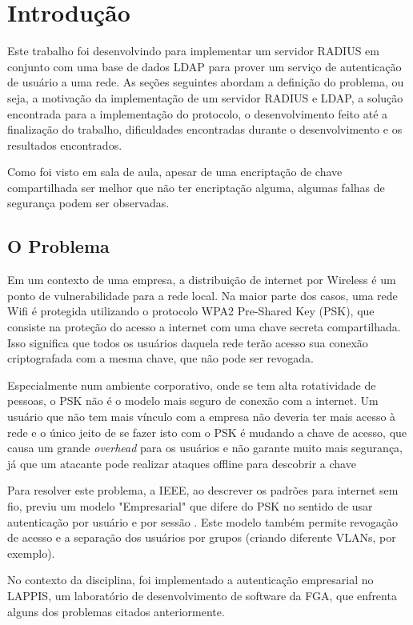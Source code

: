 \section{Introdução}

Este trabalho foi desenvolvindo para implementar um servidor RADIUS em conjunto com uma
base de dados LDAP para prover um serviço de autenticação de usuário a uma rede.
As seções seguintes abordam a definição do problema, ou seja, a motivação da implementação
de um servidor RADIUS e LDAP, a solução encontrada para a implementação do protocolo, o
desenvolvimento feito até a finalização do trabalho, dificuldades encontradas durante o
desenvolvimento e os resultados encontrados.

Como foi visto em sala de aula, apesar de uma encriptação de chave compartilhada
ser melhor que não ter encriptação alguma, algumas falhas de segurança podem ser
observadas.


\subsection{O Problema}

Em um contexto de uma empresa, a distribuição de internet por Wireless é um ponto de
vulnerabilidade para a rede local. Na maior parte dos casos, uma rede Wifi é protegida
utilizando o protocolo WPA2 Pre-Shared Key (PSK), que consiste na proteção do acesso a internet com uma
chave secreta compartilhada. Isso significa que todos os usuários daquela rede terão acesso
sua conexão criptografada com a mesma chave, que não pode ser revogada. \cite{freeradius}

Especialmente num ambiente corporativo, onde se tem alta rotatividade de pessoas,
o PSK não é o modelo mais seguro de conexão com a internet. Um usuário que não tem
mais vínculo com a empresa não deveria ter mais acesso à rede e o único jeito de se
fazer isto com o PSK é mudando a chave de acesso, que causa um grande \textit{overhead}
para os usuários e não garante muito mais segurança, já que um atacante pode realizar
ataques offline para descobrir a chave \cite{freeradius}

Para resolver este problema, a IEEE, ao descrever os padrões para internet sem fio,
previu um modelo "Empresarial" que difere do PSK no sentido de usar autenticação
por usuário e por sessão \cite{freeradius}. Este modelo também permite revogação de
acesso e a separação dos usuários por grupos (criando diferente VLANs, por exemplo). \cite{freeradius}

No contexto da disciplina, foi implementado a autenticação empresarial no LAPPIS,
um laboratório de desenvolvimento de software da FGA, que enfrenta alguns dos
problemas citados anteriormente.

